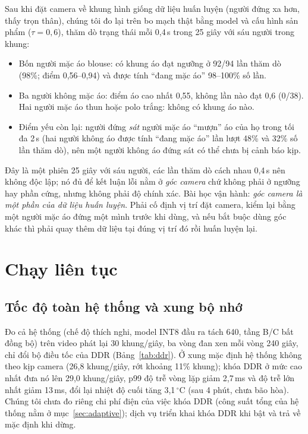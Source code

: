 \documentclass[12pt,a4paper]{article}
\begin{document}
Sau khi đặt camera về khung hình giống dữ liệu huấn luyện (người đứng xa hơn, thấy trọn thân), chúng tôi đo lại trên bo mạch thật bằng model và cấu hình sản phẩm
($\tau=0{,}6$), thăm dò trạng thái mỗi 0,4\,s trong 25 giây với sáu người trong khung:

\begin{itemize}
  \item Bốn người mặc áo blouse: có khung áo đạt ngưỡng ở 92/94 lần thăm dò (98\%; điểm 0,56--0,94) và được tính ``đang mặc áo'' 98--100\% số lần.
  \item Ba người không mặc áo: điểm áo cao nhất 0,55, không lần nào đạt 0,6 (0/38). Hai người mặc áo thun hoặc polo trắng: không có khung áo nào.
  \item Điểm yếu còn lại: người đứng \emph{sát} người mặc áo ``mượn'' áo của họ trong tối đa 2\,s (hai người không áo được tính ``đang mặc áo'' lần lượt 48\% và
        32\% số lần thăm dò), nên một người không áo đứng sát có thể chưa bị cảnh báo kịp.
\end{itemize}

Đây là một phiên 25 giây với sáu người, các lần thăm dò cách nhau 0,4\,s nên không độc lập; nó đủ để kết luận lỗi nằm ở \emph{góc camera} chứ không phải ở ngưỡng hay phần cứng,
nhưng không phải độ chính xác. Bài học vận hành: \emph{góc camera là một phần của dữ liệu huấn luyện}. Phải cố định vị trí đặt camera, kiểm lại bằng một người mặc áo
đứng một mình trước khi dùng, và nếu bắt buộc dùng góc khác thì phải quay thêm dữ liệu tại đúng vị trí đó rồi huấn luyện lại.

\section{Chạy liên tục}

\subsection{Tốc độ toàn hệ thống và xung bộ nhớ}

Đo cả hệ thống (chế độ thích nghi, model INT8 đầu ra tách 640, tầng B/C bất đồng bộ) trên video phát lại 30 khung/giây, ba vòng đan xen mỗi vòng 240 giây, chỉ đổi
bộ điều tốc của DDR (Bảng~\ref{tab:ddr}). Ở xung mặc định hệ thống không theo kịp camera (26,8 khung/giây, rớt khoảng 11\% khung); khóa DDR ở mức cao nhất đưa
nó lên 29,0 khung/giây, p99 độ trễ vòng lặp giảm 2,7\,ms và độ trễ lớn nhất giảm 13\,ms, đổi lại nhiệt độ cuối tăng 3,1\,$^\circ$C (sau 4 phút, chưa bão hòa).
Chúng tôi chưa đo riêng chi phí điện của việc khóa DDR (công suất tổng của hệ thống nằm ở mục~\ref{sec:adaptive}); dịch vụ triển khai khóa DDR khi bật và trả về mặc định khi dừng.
\end{document}
